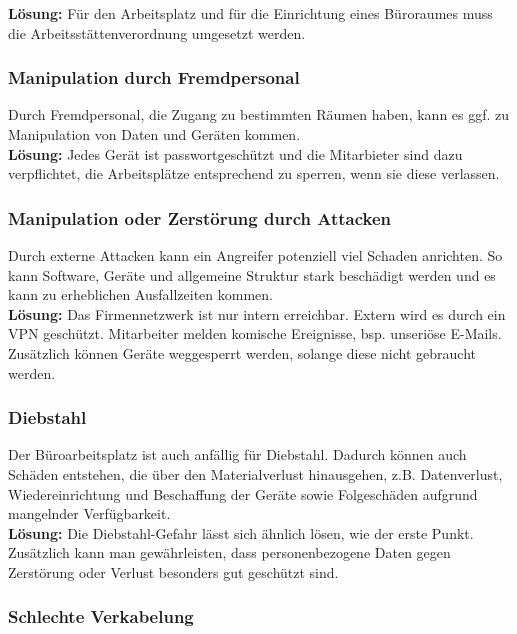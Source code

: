\documentclass[a4paper, 12pt]{report}
\begin{document}
\begin{multicols}{2}
\textbf{Lösung:} Für den Arbeitsplatz und für die Einrichtung eines Büroraumes
muss die Arbeitsstättenverordnung umgesetzt werden. 

\subsubsection{Manipulation durch Fremdpersonal}

Durch Fremdpersonal, die Zugang zu bestimmten Räumen haben, kann es ggf. zu 
Manipulation von Daten und Geräten kommen. \\

\textbf{Lösung:} Jedes Gerät ist passwortgeschützt und die Mitarbieter sind dazu
verpflichtet, die Arbeitsplätze entsprechend zu sperren, wenn sie diese 
verlassen.

\subsubsection{Manipulation oder Zerstörung durch Attacken}

Durch externe Attacken kann ein Angreifer potenziell viel Schaden anrichten. So
kann Software, Geräte und allgemeine Struktur stark beschädigt werden und es 
kann zu erheblichen Ausfallzeiten kommen. \\

\textbf{Lösung:} Das Firmennetzwerk ist nur intern erreichbar. Extern wird es 
durch ein VPN geschützt. Mitarbeiter melden komische Ereignisse, bsp. unseriöse
E-Mails. Zusätzlich können Geräte weggesperrt werden, solange diese nicht 
gebraucht werden.

\subsubsection{Diebstahl}

Der Büroarbeitsplatz ist auch anfällig für Diebstahl. Dadurch können auch 
Schäden entstehen, die über den Materialverlust hinausgehen, z.B. Datenverlust, 
Wiedereinrichtung und Beschaffung der Geräte sowie Folgeschäden aufgrund 
mangelnder Verfügbarkeit. \\

\textbf{Lösung:} Die Diebstahl-Gefahr lässt sich ähnlich lösen, wie der erste 
Punkt. Zusätzlich kann man gewährleisten, dass personenbezogene Daten gegen 
Zerstörung oder Verlust besonders gut geschützt sind. 

\subsubsection{Schlechte Verkabelung}


\end{multicols}
\end{document}
